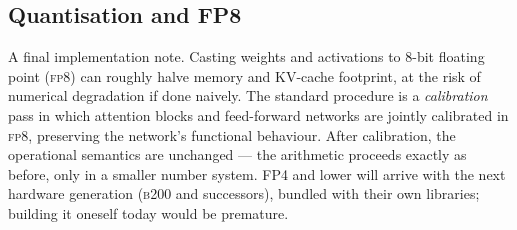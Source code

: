 \documentclass[11pt,a4paper]{article}
\theoremstyle{definition}
\theoremstyle{plain}
\begin{document}
\subsection{Quantisation and FP8}

A final implementation note. Casting weights and activations to 8-bit floating point (\textsc{fp8}) can roughly halve memory and KV-cache footprint, at the risk of numerical degradation if done naively. The standard procedure is a \emph{calibration} pass in which attention blocks and feed-forward networks are jointly calibrated in \textsc{fp8}, preserving the network's functional behaviour. After calibration, the operational semantics are unchanged --- the arithmetic proceeds exactly as before, only in a smaller number system. FP4 and lower will arrive with the next hardware generation (\textsc{b200} and successors), bundled with their own libraries; building it oneself today would be premature.
\end{document}
